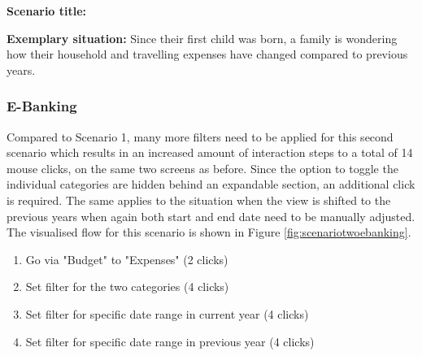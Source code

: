 \textbf{Scenario title:} \scentwo

\textbf{Exemplary situation:} Since their first child was born, a family is wondering how their household and travelling expenses have changed compared to previous years.



\subsubsection{E-Banking}

Compared to Scenario 1, many more filters need to be applied for this second scenario which results in an increased amount of interaction steps to a total of 14 mouse clicks, on the same two screens as before. Since the option to toggle the individual categories are hidden behind an expandable section, an additional click is required. The same applies to the situation when the view is shifted to the previous years when again both start and end date need to be manually adjusted. The visualised flow for this scenario is shown in Figure \ref{fig:scenariotwoebanking}.
\begin{enumerate}
	\item Go via "Budget" to "Expenses" (2 clicks)
	\item Set filter for the two categories (4 clicks)
	\item Set filter for specific date range in current year (4 clicks)
	\item Set filter for specific date range in previous year (4 clicks)
\end{enumerate}

